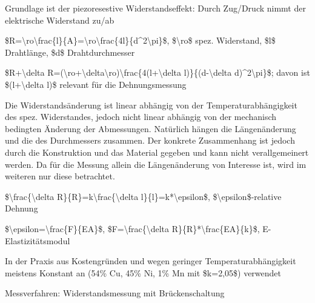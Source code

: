 \documentclass[a4paper]{article}
\begin{document}
\begin{multicols}{3}
  Grundlage ist der piezoresestive Widerstandseffekt: Durch Zug/Druck
  nimmt der elektrische Widerstand zu/ab

  \begin{itemize*}
    \item \$R=\textbackslash ro\textbackslash frac\{l\}\{A\}=\textbackslash ro\textbackslash frac\{4l\}\{d\^{}2\textbackslash pi\}\$, \$\textbackslash ro\$ spez. Widerstand, \$l\$ Drahtlänge, \$d\$ Drahtdurchmesser
    \item \$R+\textbackslash delta R=(\textbackslash ro+\textbackslash delta\textbackslash ro)\textbackslash frac\{4(l+\textbackslash delta l)\}\{(d-\textbackslash delta d)\^{}2\textbackslash pi\}\$; davon ist \$(l+\textbackslash delta l)\$ relevant für die Dehnungsmessung
  \end{itemize*}

  Die Widerstandsänderung ist linear abhängig von der
  Temperaturabhängigkeit des spez. Widerstandes, jedoch nicht linear
  abhängig von der mechanisch bedingten Änderung der Abmessungen.
  Natürlich hängen die Längenänderung und die des Durchmessers zusammen.
  Der konkrete Zusammenhang ist jedoch durch die Konstruktion und das
  Material gegeben und kann nicht verallgemeinert werden. Da für die
  Messung allein die Längenänderung von Interesse ist, wird im weiteren
  nur diese betrachtet.

  \begin{itemize*}
    \item \$\textbackslash frac\{\textbackslash delta R\}\{R\}=k\textbackslash frac\{\textbackslash delta l\}\{l\}=k*\textbackslash epsilon\$, \$\textbackslash epsilon\$-relative Dehnung
    \item \$\textbackslash epsilon=\textbackslash frac\{F\}\{EA\}\$, \$F=\textbackslash frac\{\textbackslash delta R\}\{R\}*\textbackslash frac\{EA\}\{k\}\$, E-Elastizitätsmodul
    \item In der Praxis aus Kostengründen und wegen geringer Temperaturabhängigkeit meistens Konstant an (54\% Cu, 45\% Ni, 1\% Mn mit \$k=2,05\$) verwendet
  \end{itemize*}

  Messverfahren: Widerstandsmessung mit Brückenschaltung


\end{multicols}
\end{document}
